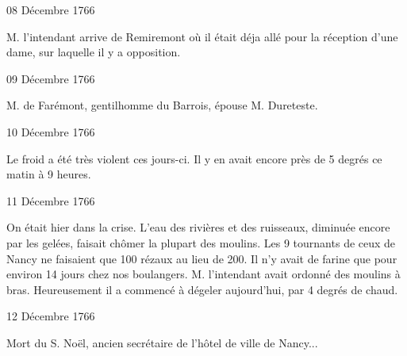                      \begin{diary}{08 Décembre 1766}{}


                           M. l’intendant arrive de Remiremont
                           où il était déja allé pour la réception d’une
                           dame, sur laquelle il y a opposition. \bigskip


                     \end{diary}

                     \begin{diary}{09 Décembre 1766}{}


                           M. de Farémont, gentilhomme du
                              Barrois,
                           épouse M.
                              Dureteste. \bigskip


                     \end{diary}

                     \begin{diary}{10 Décembre 1766}{}

                         Le froid a été très violent ces
                           jours-ci.
                           Il y en avait encore près de 5 degrés
                           ce matin à 9
                              heures. \bigskip


                     \end{diary}

                     \begin{diary}{11 Décembre 1766}{}

                         On était hier dans la
                           crise. L’eau des
                           rivières et des ruisseaux, diminuée encore
                           par les gelées, faisait chômer la plupart
                           des moulins. Les 9 tournants de ceux de
                           Nancy ne faisaient que 100 rézaux au lieu
                           de 200. Il n’y avait de farine que pour
                           environ 14 jours chez nos boulangers.
                           M. l’intendant avait
                           ordonné des moulins
                           à bras. Heureusement il a commencé à
                           dégeler aujourd'hui, par 4 degrés de chaud. \bigskip


                     \end{diary}

                     \begin{diary}{12 Décembre 1766}{}

                         Mort du S.
                              Noël, ancien secrétaire de
                           l’hôtel de ville de Nancy... \bigskip


                     \end{diary}

